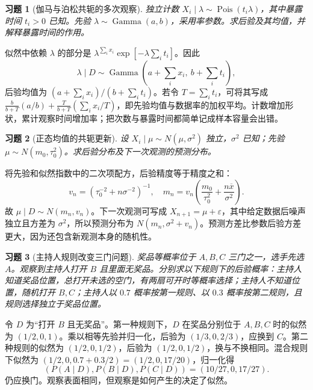\documentclass[12pt,fontset=fandol]{ctexart}
\newtheorem{exercise}{习题}[section]
\begin{document}
\begin{exercise}[伽马与泊松共轭的多次观察]\label{q:B12.2}
独立计数 $X_i\mid\lambda\sim\operatorname{Pois}(t_i\lambda)$，其中暴露时间 $t_i>0$ 已知。先验 $\lambda\sim\operatorname{Gamma}(a,b)$，采用率参数。求后验及其均值，并解释暴露时间的作用。\par{}
\end{exercise}

\begin{solve}\label{a:B12.2}似然中依赖 $\lambda$ 的部分是 $\lambda^{\sum_i x_i}\exp[-\lambda\sum_i t_i]$。因此\[\lambda\mid D\sim\operatorname{Gamma}\left(a+\sum_i x_i,\ b+\sum_i t_i\right),\]后验均值为 $(a+\sum_i x_i)/(b+\sum_i t_i)$。若令 $T=\sum_i t_i$，可将其写成 $\frac{b}{b+T}(a/b)+\frac{T}{b+T}(\sum_i x_i/T)$，即先验均值与数据率的加权平均。计数增加形状，累计观察时间增加率；把次数与暴露时间都简单记成样本容量会出错。\end{solve}

\begin{exercise}[正态均值的共轭更新]\label{q:B12.3}
设 $X_i\mid\mu\sim N(\mu,\sigma^2)$ 独立，$\sigma^2$ 已知；先验 $\mu\sim N(m_0,\tau_0^2)$。求后验分布及下一次观测的预测分布。\par{}
\end{exercise}

\begin{solve}\label{a:B12.3}将先验和似然指数中的二次项配方，后验精度等于精度之和：\[v_n=\left(\tau_0^{-2}+n\sigma^{-2}\right)^{-1},\quad m_n=v_n\left(\frac{m_0}{\tau_0^2}+\frac{n\overline x}{\sigma^2}\right).\]故 $\mu\mid D\sim N(m_n,v_n)$。下一次观测可写成 $X_{n+1}=\mu+\varepsilon$，其中给定数据后噪声独立且方差为 $\sigma^2$，所以预测分布为 $N(m_n,\sigma^2+v_n)$。预测方差比参数后验方差更大，因为还包含新观测本身的随机性。\end{solve}

\begin{exercise}[主持人规则改变三门问题]\label{q:M-P7-1}
奖品等概率位于 $A,B,C$ 三门之一，选手先选 $A$。观察到主持人打开 $B$ 且里面无奖品。分别求以下规则下的后验概率：主持人知道奖品位置，总打开未选的空门，有两扇可开时等概率选择；主持人不知道位置，随机打开 $B,C$；主持人以 $0.7$ 概率按第一规则、以 $0.3$ 概率按第二规则，且规则选择独立于奖品位置。\par{}
\end{exercise}

\begin{solve}\label{a:M-P7-1}令 $D$ 为“打开 $B$ 且无奖品”。第一种规则下，$D$ 在奖品分别位于 $A,B,C$ 时的似然为 $(1/2,0,1)$。乘以相等先验并归一化，后验为 $(1/3,0,2/3)$，应换到 $C$。第二种规则的似然为 $(1/2,0,1/2)$，后验为 $(1/2,0,1/2)$，换与不换相同。混合规则下似然为 $(1/2,0,0.7+0.3/2)=(1/2,0,17/20)$，归一化得\[(P(A\mid D),P(B\mid D),P(C\mid D))=(10/27,0,17/27).\]仍应换门。观察表面相同，但观察是如何产生的决定了似然。\end{solve}
\end{document}

